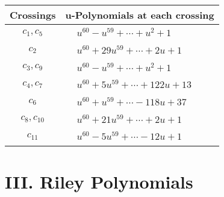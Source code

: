 \documentclass[1p]{elsarticle_modified}
\theoremstyle{definition}
\begin{document}
\begin{tabular}{m{50pt}|m{274pt}}
Crossings & \hspace{64pt}u-Polynomials at each crossing \\
\hline $$\begin{aligned}c_{1},c_{5}\end{aligned}$$&$\begin{aligned}
&u^{60}- u^{59}+\cdots+u^2+1
\end{aligned}$\\
\hline $$\begin{aligned}c_{2}\end{aligned}$$&$\begin{aligned}
&u^{60}+29 u^{59}+\cdots+2 u+1
\end{aligned}$\\
\hline $$\begin{aligned}c_{3},c_{9}\end{aligned}$$&$\begin{aligned}
&u^{60}- u^{59}+\cdots+u^2+1
\end{aligned}$\\
\hline $$\begin{aligned}c_{4},c_{7}\end{aligned}$$&$\begin{aligned}
&u^{60}+5 u^{59}+\cdots+122 u+13
\end{aligned}$\\
\hline $$\begin{aligned}c_{6}\end{aligned}$$&$\begin{aligned}
&u^{60}+u^{59}+\cdots-118 u+37
\end{aligned}$\\
\hline $$\begin{aligned}c_{8},c_{10}\end{aligned}$$&$\begin{aligned}
&u^{60}+21 u^{59}+\cdots+2 u+1
\end{aligned}$\\
\hline $$\begin{aligned}c_{11}\end{aligned}$$&$\begin{aligned}
&u^{60}-5 u^{59}+\cdots-12 u+1
\end{aligned}$\\
\hline
\end{tabular}\newpage\renewcommand{\arraystretch}{1}
\centering \section*{ III. Riley Polynomials}
\end{document}
